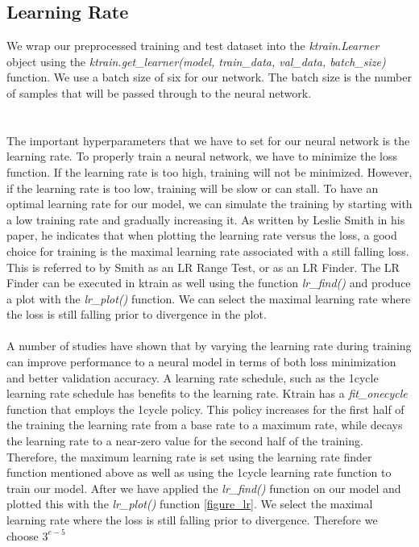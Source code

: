 \subsection{Learning Rate}
We wrap our preprocessed training and test dataset into the \textit{ktrain.Learner} object using the \textit{ktrain.get\_learner(model, train\_data, val\_data, batch\_size)} function. We use a batch size of six for our network. The batch size is the number of samples that will be passed through to the neural network.\\\\
\\The important hyperparameters that we have to set for our neural network is the learning rate. To properly train a neural network, we have to minimize the loss function. If the learning rate is too high, training will not be minimized. However, if the learning rate is too low, training will be slow or can stall. 
To have an optimal learning rate for our model, we can simulate the training by starting with a low training rate and gradually increasing it. As written by Leslie Smith \cite{Learning_Rate} in his paper, he indicates that when plotting the learning rate versus the loss, a good choice for training is the maximal learning rate associated with a still falling loss. This is referred to by Smith as an LR Range Test, or as an LR Finder. The LR Finder can be executed in ktrain as well using the function \textit{lr\_find()} and produce a plot with the \textit{lr\_plot()} function. We can select the maximal learning rate where the loss is still falling prior to divergence in the plot.\\\\ 
A number of studies have shown that by varying the learning rate during training can improve performance to a neural model in terms of both loss minimization and better validation accuracy. A learning rate schedule, such as the 1cycle learning rate schedule \cite{cycle_learning_rate} has benefits to the learning rate. Ktrain has a \textit{fit\_onecycle} function that employs the 1cycle policy. This policy increases for the first half of the training the learning rate from a base rate to a maximum rate, while decays the learning rate to a near-zero value for the second half of the training. Therefore, the maximum learning rate is set using the learning rate finder function mentioned above as well as using the 1cycle learning rate function to train our model.
After we have applied the \textit{lr\_find()} function on our model and plotted this with the \textit{lr\_plot()} function \ref{figure_lr}. We select the maximal learning rate where the loss is still falling prior to divergence. Therefore we choose $3^{e-5}$

